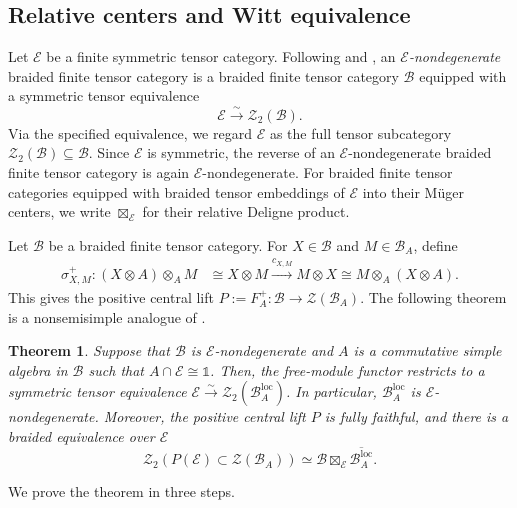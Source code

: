 \documentclass[11pt,reqno]{amsart}
\numberwithin{equation}{section}
\theoremstyle{plain}
\newtheorem{theorem}[thmctr]{Theorem}
\theoremstyle{definition}
\theoremstyle{remark}
\newcommand{\unit}{\mathds{1}}
\newcommand{\B}{\mathcal{B}}
\newcommand{\E}{\mathcal{E}}
\newcommand{\Z}{\mathcal{Z}}
\newcommand{\loc}{\mathrm{loc}}
\begin{document}

\subsection{Relative centers and Witt equivalence}
\label{subsec:relative-centers-witt}

Let $\E$ be a finite symmetric tensor category. Following
\cite[Definition~4.1]{davydov2013structure} and
\cite[\S5.3]{decoppetstroinski2026pre}, an
\emph{$\E$-nondegenerate} braided finite tensor category is a braided finite
tensor category $\B$ equipped with a symmetric tensor equivalence
\[
  \E\xrightarrow{\sim}\Z_2(\B).
\]
Via the specified equivalence, we regard $\E$ as the full tensor subcategory
$\Z_2(\B)\subseteq\B$. Since $\E$ is symmetric, the reverse of an
$\E$-nondegenerate braided finite tensor category is again
$\E$-nondegenerate. For braided finite tensor categories equipped with braided
tensor embeddings of $\E$ into their M\"uger centers, we write
$\boxtimes_{\E}$ for their relative Deligne product.


Let $\B$ be a braided finite tensor category. 
For $X\in\B$ and $M\in\B_A$, define
\[
\begin{aligned}
  \sigma^+_{X,M}:(X\otimes A)\otimes_A M
  &\cong X\otimes M
  \xrightarrow{c_{X,M}} M\otimes X
  \cong M\otimes_A(X\otimes A).
\end{aligned}
\]
This gives the positive central lift $P:=F_A^+:\B\longrightarrow\Z(\B_A)$. 
The following theorem is a nonsemisimple analogue of
\cite[Corollary~4.6]{davydov2013structure}.

\begin{theorem}\label{thm:relative-center-local-modules}
Suppose that $\B$ is $\E$-nondegenerate and $A$ is
a commutative simple algebra in $\B$ such that $A\cap\E\cong\unit$. 
Then, the free-module functor restricts to a symmetric tensor equivalence
$\E\xrightarrow{\sim}\Z_2(\B_A^{\loc})$. In particular,
$\B_A^{\loc}$ is $\E$-nondegenerate. Moreover, the positive
central lift $P$ is fully faithful, and there is a braided equivalence over
$\E$
\[
  \Z_2(P(\E)\subset \Z(\B_A))
  \simeq
  \B\boxtimes_{\E}\overline{\B_A^{\loc}}.
\]
\end{theorem}

We prove the theorem in three steps. 
\end{document}
